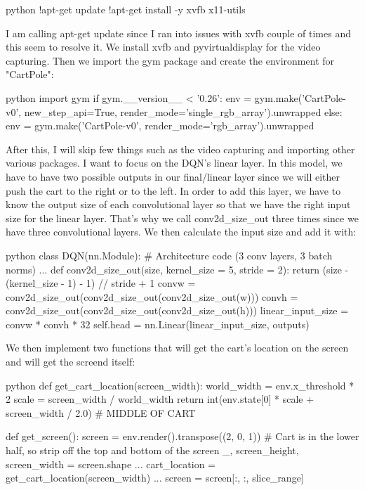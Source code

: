 \documentclass{article}
\numberwithin{equation}{section}
\numberwithin{equation}{section}
\begin{document}
\begin{mintedbox}{python}
!apt-get update
!apt-get install -y xvfb x11-utils
\end{mintedbox}

I am calling apt-get update since I ran into issues with xvfb couple of times and this seem to resolve it. We install xvfb and pyvirtualdisplay for the video capturing. Then we import the gym package and create the environment for "CartPole":

\begin{mintedbox}{python}
import gym
if gym.__version__ < '0.26':
    env = gym.make('CartPole-v0', new_step_api=True, render_mode='single_rgb_array').unwrapped
else:
    env = gym.make('CartPole-v0', render_mode='rgb_array').unwrapped
\end{mintedbox}

After this, I will skip few things such as the video capturing and importing other various packages. I want to focus on the DQN's linear layer. In this model, we have to have two possible outputs in our final/linear layer since we will either push the cart to the right or to the left. In order to add this layer, we have to know the output size of each convolutional layer so that we have the right input size for the linear layer. That's why we call conv2d\_size\_out three times since we have three convolutional layers. We then calculate the input size and add it with: 

\begin{mintedbox}{python}
class DQN(nn.Module):
# Architecture code (3 conv layers, 3 batch norms)
...
        def conv2d_size_out(size, kernel_size = 5, stride = 2):
            return (size - (kernel_size - 1) - 1) // stride  + 1
        convw = conv2d_size_out(conv2d_size_out(conv2d_size_out(w)))
        convh = conv2d_size_out(conv2d_size_out(conv2d_size_out(h)))
        linear_input_size = convw * convh * 32
        self.head = nn.Linear(linear_input_size, outputs)
\end{mintedbox}

We then implement two functions that will get the cart's location on the screen and will get the screend itself:

\begin{mintedbox}{python}
def get_cart_location(screen_width):
world_width = env.x_threshold * 2
    scale = screen_width / world_width
    return int(env.state[0] * scale + screen_width / 2.0)  # MIDDLE OF CART

def get_screen():
screen = env.render().transpose((2, 0, 1))
    # Cart is in the lower half, so strip off the top and bottom of the screen
    _, screen_height, screen_width = screen.shape
...
cart_location = get_cart_location(screen_width)
...
screen = screen[:, :, slice_range]
\end{mintedbox}
\end{document}
